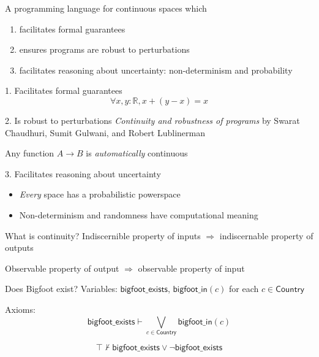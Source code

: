 \documentclass[14pt, notes]{beamer}
\newcommand{\R}{\mathbb{R}}
\begin{document}
\begin{frame}
A programming language for continuous spaces which
\begin{enumerate}
\item facilitates formal guarantees
\item ensures programs are robust to perturbations
\item facilitates reasoning about uncertainty: non-determinism and probability
\end{enumerate}
\end{frame}

\begin{frame}{1. Facilitates formal guarantees}
\[
\forall x, y : \R, x + (y - x) = x
\]
\end{frame}

\begin{frame}{2. Is robust to perturbations}
\emph{Continuity and robustness of programs} by Swarat Chaudhuri, Sumit Gulwani, and Robert Lublinerman

Any function $A \to B$ is \emph{automatically} continuous
\end{frame}

\begin{frame}{3. Facilitates reasoning about uncertainty}
\begin{itemize}
\item \emph{Every} space has a probabilistic powerspace
\item Non-determinism and randomness have computational meaning
\end{itemize}
\end{frame}

\begin{frame}{What is continuity?}
Indiscernible property of inputs $\Rightarrow$ indiscernable property of outputs

Observable property of output $\Rightarrow$ observable property of input
\end{frame}


\begin{frame}{Does Bigfoot exist?}
Variables: $\mathsf{bigfoot\_exists}$, $\mathsf{bigfoot\_in}(c)$ for each $c \in \mathsf{Country}$

Axioms:
\[
\mathsf{bigfoot\_exists} \vdash \bigvee_{c \in \mathsf{Country}} \mathsf{bigfoot\_in}(c)
\]

\pause
\[
\top \nvdash \mathsf{bigfoot\_exists} \vee \neg \mathsf{bigfoot\_exists} 
\]

\end{frame}
\end{document}
